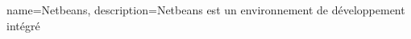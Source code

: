 {
	name={Netbeans},
	description={Netbeans est un environnement de développement intégré}
}















